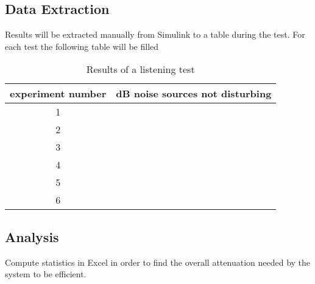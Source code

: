 
\subsection{Data Extraction}
Results will be extracted manually from Simulink to a table during the test.
For each test the following table will be filled \\
\begin{table}[H]
\centering
	\begin{tabular}{c  c} \toprule
		experiment number & dB noise sources not disturbing  \\ \bottomrule
		1	&   \\
		2	&	\\
		3	&	\\
		4	&	\\
		5	&	\\
		6	&	\\ \bottomrule
	\end{tabular}
	\caption{Results of a listening test}
	\label{tab:ListeningRes}
\end{table}

\subsection{Analysis}
Compute statistics in Excel in order to find the overall attenuation needed by the system to be efficient.


